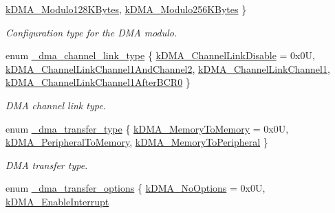 \begin{DoxyCompactItemize}
\mbox{\hyperlink{group__dma_ggac84ba3b7ce788dc06afbda949e9a039babdb5276d85626400218399229879e050}{k\+D\+M\+A\+\_\+\+Modulo128\+K\+Bytes}}, 
\mbox{\hyperlink{group__dma_ggac84ba3b7ce788dc06afbda949e9a039ba868be515efaf346dc08b08a37a239654}{k\+D\+M\+A\+\_\+\+Modulo256\+K\+Bytes}}
 \}
\begin{DoxyCompactList}\small\item\em Configuration type for the D\+MA modulo. \end{DoxyCompactList}\item 
enum \mbox{\hyperlink{group__dma_ga741c3a62f7938bf691a12d6304f0247c}{\+\_\+dma\+\_\+channel\+\_\+link\+\_\+type}} \{ \mbox{\hyperlink{group__dma_gga741c3a62f7938bf691a12d6304f0247caf31c1f53736aa000546413022b8c3280}{k\+D\+M\+A\+\_\+\+Channel\+Link\+Disable}} = 0x0U, 
\mbox{\hyperlink{group__dma_gga741c3a62f7938bf691a12d6304f0247ca0d5d1186513e85268a131166d042497c}{k\+D\+M\+A\+\_\+\+Channel\+Link\+Channel1\+And\+Channel2}}, 
\mbox{\hyperlink{group__dma_gga741c3a62f7938bf691a12d6304f0247ca580b4a8b49c2d75de4171bcf0d2615b4}{k\+D\+M\+A\+\_\+\+Channel\+Link\+Channel1}}, 
\mbox{\hyperlink{group__dma_gga741c3a62f7938bf691a12d6304f0247ca10fb1aa6120440f198e6e6ccf6100bc1}{k\+D\+M\+A\+\_\+\+Channel\+Link\+Channel1\+After\+B\+C\+R0}}
 \}
\begin{DoxyCompactList}\small\item\em D\+MA channel link type. \end{DoxyCompactList}\item 
enum \mbox{\hyperlink{group__dma_ga8eb175ece33c966ea83656c6b38e95cb}{\+\_\+dma\+\_\+transfer\+\_\+type}} \{ \mbox{\hyperlink{group__dma_gga8eb175ece33c966ea83656c6b38e95cba24392a93deeb55e04559201839343f3c}{k\+D\+M\+A\+\_\+\+Memory\+To\+Memory}} = 0x0U, 
\mbox{\hyperlink{group__dma_gga8eb175ece33c966ea83656c6b38e95cba7bf1938ae68b1f494aade7a0f4189303}{k\+D\+M\+A\+\_\+\+Peripheral\+To\+Memory}}, 
\mbox{\hyperlink{group__dma_gga8eb175ece33c966ea83656c6b38e95cbaae1c6bab576d7a25d2fa1249f9cd4ee9}{k\+D\+M\+A\+\_\+\+Memory\+To\+Peripheral}}
 \}
\begin{DoxyCompactList}\small\item\em D\+MA transfer type. \end{DoxyCompactList}\item 
enum \mbox{\hyperlink{group__dma_ga1497caa1db3c7b45b95f6c8658167fe1}{\+\_\+dma\+\_\+transfer\+\_\+options}} \{ \mbox{\hyperlink{group__dma_gga1497caa1db3c7b45b95f6c8658167fe1addc6103be52651841e795cccc872988b}{k\+D\+M\+A\+\_\+\+No\+Options}} = 0x0U, 
\mbox{\hyperlink{group__dma_gga1497caa1db3c7b45b95f6c8658167fe1ad289b8b98ee6cf2faa4788404fe809d8}{k\+D\+M\+A\+\_\+\+Enable\+Interrupt}}

\end{DoxyCompactItemize}

